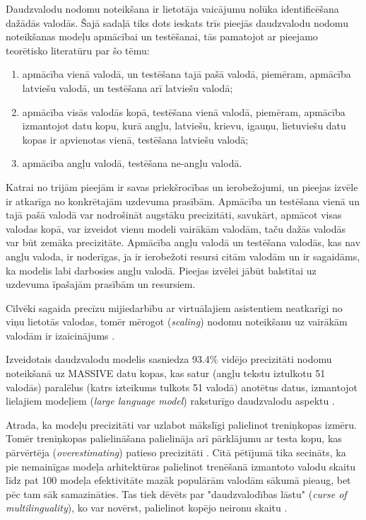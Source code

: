 Daudzvalodu nodomu noteikšana ir lietotāja vaicājumu nolūka identificēšana dažādās valodās. Šajā sadaļā tiks dots ieskats trīs pieejās daudzvalodu nodomu noteikšanas modeļu apmācībai un testēšanai, tās pamatojot ar pieejamo teorētisko literatūru par šo tēmu:
\begin{enumerate}
	\item apmācība vienā valodā, un testēšana tajā pašā valodā, piemēram, apmācība latviešu valodā, un testēšana arī latviešu valodā;
	\item apmācība visās valodās kopā, testēšana vienā valodā, piemēram, apmācība izmantojot datu kopu, kurā angļu, latviešu, krievu, igauņu, lietuviešu datu kopas ir apvienotas vienā, testēšana latviešu valodā;
	\item apmācība angļu valodā, testēšana ne-angļu valodā.
\end{enumerate}

Katrai no trijām pieejām ir savas priekšrocības un ierobežojumi, un pieejas izvēle ir atkarīga no konkrētajām uzdevuma prasībām. Apmācība un testēšana vienā un tajā pašā valodā var nodrošināt augstāku precizitāti, savukārt, apmācot visas valodas kopā, var izveidot vienu modeli vairākām valodām, taču dažās valodās var būt zemāka precizitāte. Apmācība angļu valodā un testēšana valodās, kas nav angļu valoda, ir noderīgas, ja ir ierobežoti resursi citām valodām un ir sagaidāms, ka modelis labi darbosies angļu valodā. Pieejas izvēlei jābūt balstītai uz uzdevuma īpašajām prasībām un resursiem.



Cilvēki sagaida precīzu mijiedarbību ar virtuālajiem asistentiem neatkarīgi no viņu lietotās valodas, tomēr mērogot (\textit{scaling}) nodomu noteikšanu uz vairākām valodām ir izaicinājums \cite{de-bruyn-2022}. 



Izveidotais daudzvalodu modelis sasniedza 93.4\% vidējo precizitāti nodomu noteikšanā uz MASSIVE datu kopas, kas satur (angļu tekstu iztulkotu 51 valodās) paralēlus (katrs izteikums tulkots 51 valodā) anotētus datus, izmantojot lielajiem modeļiem (\textit{large language model}) raksturīgo daudzvalodu aspektu \cite{de-bruyn-2022}.

Atrada, ka modeļu precizitāti var uzlabot mākslīgi palielinot treniņkopas izmēru. Tomēr treniņkopas palielināšana palielināja arī pārklājumu ar testa kopu, kas pārvērtēja (\textit{overestimating}) patieso precizitāti \cite{de-bruyn-2022}. Citā pētījumā tika secināts, ka pie nemainīgas modeļa arhitektūras palielinot trenēšanā izmantoto valodu skaitu līdz pat 100 modeļa efektivitāte mazāk populārām valodām sākumā pieaug, bet pēc tam sāk samazināties. Tas tiek dēvēts par "daudzvalodības lāstu" (\textit{curse of multilinguality}), ko var novērst, palielinot kopējo neironu skaitu \cite{conneau2020}.



